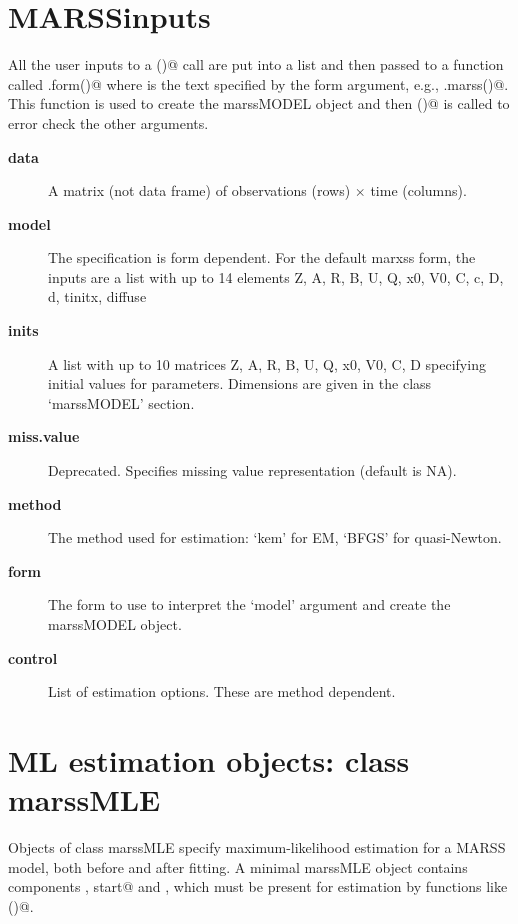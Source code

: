 \section*{MARSSinputs}

All the user inputs to a \verb@MARSS()@ call are put into a list and then passed to a function called \verb@MARSS.form()@ where \verb@form@ is the text specified by the form argument, e.g., \verb@MARSS.marss()@.  This function is used to create the marssMODEL object and then \verb@MARSScheckinputs()@ is called to error check the other arguments.

  \begin{description}
  
  \item[\textbf{data}]{ A matrix (not data frame) of observations (rows) $\times$ time (columns).  }
  \item[\textbf{model}]{ The specification is form dependent.  For the default marxss form, the inputs are a list with up to 14  elements Z, A, R, B, U, Q, x0, V0, C, c, D, d, tinitx, diffuse }
  \item[\textbf{inits}]{ A list with up to 10 matrices Z, A, R, B, U, Q, x0, V0, C, D specifying initial values for parameters. Dimensions are given in the class `marssMODEL' section. }
  \item[\textbf{miss.value}]{ Deprecated. Specifies missing value representation (default is NA). }
  \item[\textbf{method}]{ The method used for estimation: `kem' for EM, `BFGS' for quasi-Newton.}
  \item[\textbf{form}]{ The form to use to interpret the `model' argument and create the marssMODEL object.}
  \item[\textbf{control}]{ List of estimation options. These are method dependent. }  
  \end{description}


\section*{ML estimation objects: class marssMLE}

Objects of class marssMLE specify maximum-likelihood estimation for a MARSS model, both before and after fitting. A minimal marssMLE object contains components \verb@model, start@ and \verb@control@, which must be present for estimation by functions like \verb@MARSSkem()@.


